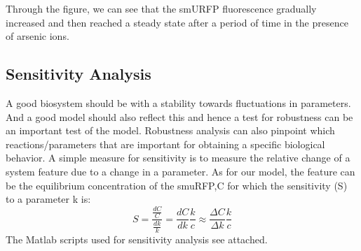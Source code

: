 Through the figure, we can see that the smURFP fluorescence gradually increased and then reached a steady state after a period of time  in the presence of arsenic ions.


\subsection{Sensitivity Analysis}
A good biosystem should be with a stability towards fluctuations in parameters. And  a  good model should also reflect this and hence a test for robustness can be an important test of the model.
Robustness analysis can also pinpoint which reactions/parameters that are important for obtaining a specific biological behavior. A simple measure for sensitivity is to measure the relative change of a system feature due to a change in a parameter. As for our model, the feature can be the equilibrium concentration of the smuRFP,C for which the sensitivity (S) to a parameter k is:
\begin{equation}
S=\frac{\frac{dC}{C}}{\frac{dk}{k}}=\frac{dC}{dk}\frac{k}{c}\approx \frac{\Delta C}{\Delta k}\frac{k}{c}
\end{equation}
The Matlab scripts used for sensitivity analysis see attached.
